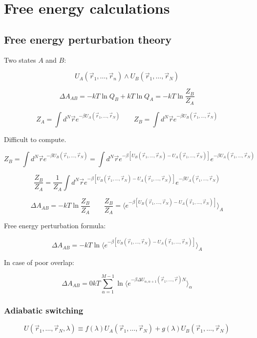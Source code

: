 \graphicspath{{chapters/18/images}}
\chapter{Free energy calculations}

\section{Free energy perturbation theory}
Two states $A$ and $B$:

$$U_A(\vec{r}_1, \dots, \vec{r}_n)\land U_{B}(\vec{r}_1, \dots, \vec{r}_N)$$

$$\Delta A_{AB} = -kT\ln Q_B + kT\ln Q_A = -kT\ln\frac{Z_B}{Z_A}$$

$$Z_A = \int d^N\vec{r}e^{-\beta U_A(\vec{r}_1, \dots, \vec{r}_N)}\qquad Z_B = \int d^N\vec{r}e^{-\beta U_B(\vec{r}_1, \dots, \vec{r}_N)}$$

Difficult to compute.

$$Z_B = \int d^N\vec{r}e^{-\beta U_B(\vec{r}_1, \dots, \vec{r}_N)} = \int d^N\vec{r}e^{-\beta[U_B(\vec{r}_1, \dots, \vec{r}_N)-U_{A}(\vec{r}_1, \dots, \vec{r}_N)]}e^{-\beta U_A(\vec{r}_1, \dots, \vec{r}_N)}$$

$$\frac{Z_B}{Z_A} = \frac{1}{Z_A}\int d^N\vec{r}e^{-\beta[U_B(\vec{r}_1, \dots, \vec{r}_N)-U_{A}(\vec{r}_1, \dots, \vec{r}_N)]}e^{-\beta U_A(\vec{r}_1, \dots, \vec{r}_N)}$$


$$\Delta A_{AB} = -kT\ln\frac{Z_B}{Z_A}\qquad\frac{Z_B}{Z_A} = \biggl\langle e^{-\beta[U_B(\vec{r}_1, \dots, \vec{r}_N)-U_A(\vec{r}_1, \dots, \vec{r}_N)]}\biggr\rangle_A$$

Free energy perturbation formula:

$$\Delta A_{AB} = -kT\ln\biggl\langle e^{-\beta[U_B(\vec{r}_1, \dots, \vec{r}_N)-U_A(\vec{r}_1, \dots, \vec{r}_N)]}\biggr\rangle_A$$

In case of poor overlap:

$$\Delta A_{AB}=0kT\sum\limits_{\alpha=1}^{M-1}\ln\bigl\langle e^{-\beta\Delta U_{\alpha, \alpha+1}(\vec{r}_1, \dots,\vec{r})N}\bigr\rangle_\alpha$$

	\subsection{Adiabatic switching}

	$$U(\vec{r}_1, \dots, \vec{r}_N, \lambda) \equiv f(\lambda)U_A(\vec{r}_1, \dots, \vec{r}_N)+g(\lambda)U_B(\vec{r}_1, \dots, \vec{r}_N)$$

